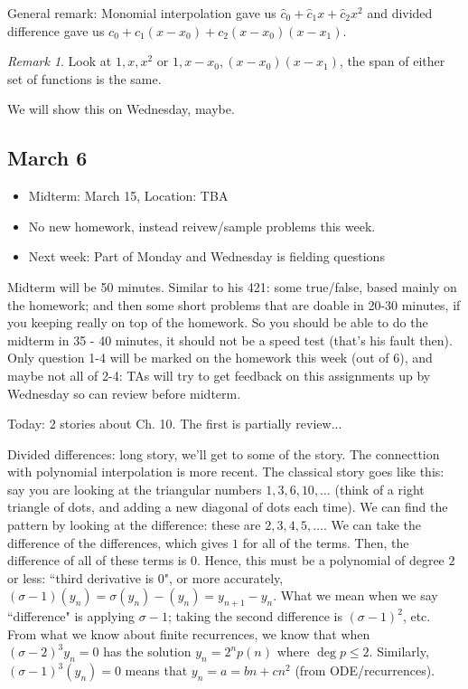 \documentclass{article}
\theoremstyle{plain}
\theoremstyle{remark}
\newtheorem{remark}{Remark}
\begin{document}
General remark:
Monomial interpolation gave us $\hat{c}_0 + \hat{c}_1x + \hat{c}_2x^2$
and divided difference gave us $c_0 + c_1(x-x_0) + c_2(x-x_0)(x-x_1)$.
\begin{remark}
	Look at $1,x,x^2$ or $1,x-x_0,(x-x_0)(x-x_1)$,
	the span of either set of functions is the same.
\end{remark}
We will show this on Wednesday, maybe.


\subsection{March 6}
\begin{itemize}
	\item Midterm: March 15, Location: TBA
	\item No new homework, instead reivew/sample problems this week.
	\item Next week: Part of Monday and Wednesday is fielding questions
\end{itemize}
Midterm will be 50 minutes.
Similar to his 421:
some true/false, based mainly on the homework;
and then some short problems that are doable in 20-30 minutes,
if you keeping really on top of the homework.
So you should be able to do the midterm in 35 - 40 minutes,
it should not be a speed test (that's his fault then).
Only question 1-4 will be marked on the homework this week (out of 6),
and maybe not all of 2-4: TAs will try to get feedback on this assignments
up by Wednesday so can review before midterm.

Today: $2$ stories about Ch. 10. The first is partially review...

Divided differences: long story, we'll get to some of the story.
The connecttion with polynomial interpolation is more recent.
The classical story goes like this:
say you are looking at the triangular numbers
$1,3,6,10,\dots$ (think of a right triangle of dots,
and adding a new diagonal of dots each time).
We can find the pattern by looking at the difference:
these are $2,3,4,5,\dots$.
We can take the difference of the differences, which gives $1$ for all of the terms.
Then, the difference of all of these terms is $0$.
Hence, this must be a polynomial of degree $2$ or less: ``third derivative is $0$",
or more accurately, $(\sigma - 1)(y_n) = \sigma(y_n) - (y_n) = y_{n+1} - y_n$.
What we mean when we say ``difference" is applying $\sigma - 1$;
taking the second difference is $(\sigma-1)^2$, etc.
From what we know about finite recurrences, we know that
when $(\sigma - 2)^3y_n = 0$ has the solution
$y_n = 2^n p(n)$ where $\deg{p} \leq 2$.
Similarly, $(\sigma-1)^3(y_n) = 0$ means that $y_n = a = bn + cn^2$
(from ODE/recurrences).
\end{document}

